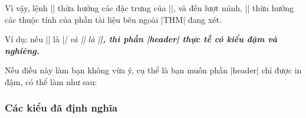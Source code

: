 \documentclass[11pt,oneside]{ltxdoc}
\theoremstyle{marginbreak}
\theoremstyle{changebreak}
\theoremstyle{change}
\theoremstyle{plain}
\theoremstyle{nonumberplain}
\begin{document}
Vì vậy, lệnh |\theoremheaderfont| thừa hưởng các đặc trưng của |\theorembodyfont|,
và đến lượt mình, |\theorembodyfont| thừa hưởng các thuộc tính của phần
tài liệu bên ngoài |THM| đang xét.

\medskip
Ví dụ:
nếu |\theorembodyfont| là |\itshape| và |\theoremheaderfont| là |\bfseries|,
thì phần |header| thực tế có kiểu \textbf{\textit{đậm và nghiêng}}.

\medskip
Nếu điều này làm bạn không vừa ý, cụ thể là bạn muốn phần |header|
chỉ được in đậm, có thể làm như sau:
\begin{example}
  \theoremheaderfont{\normalfont\bfseries}
\end{example}


\subsubsection{Các kiểu đã định nghĩa}

\label{sec:predefdstyles}
\end{document}

